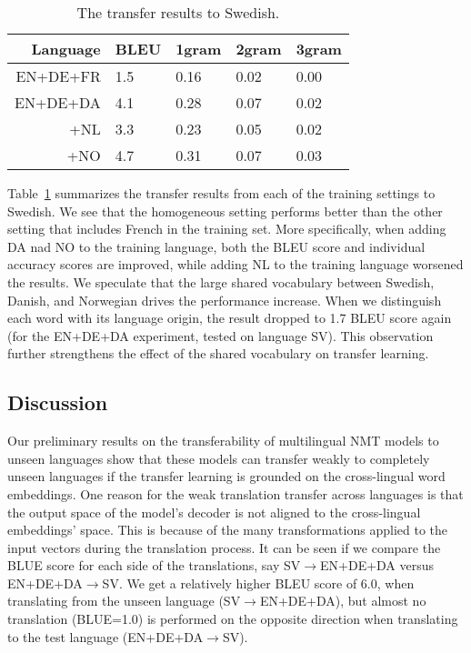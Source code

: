 \documentclass[11pt,a4paper]{article}
\begin{document}
\begin{table}
 \centering
 \begin{tabular}{|r|l|l|l|l|}
 \hline
 Language & BLEU & 1gram & 2gram & 3gram \\ [0.25ex]
 \hline\hline
 EN+DE+FR & 1.5 & 0.16 & 0.02 & 0.00 \\
 \hline
 EN+DE+DA & 4.1 & 0.28 & 0.07 & 0.02 \\
 \hline
 +NL & 3.3 & 0.23 & 0.05 & 0.02 \\ 
 \hline
 +NO & 4.7 & 0.31 & 0.07 & 0.03 \\
 \hline
 \end{tabular}
 \caption{The transfer results to Swedish.} %
 \label{table:language_similarity}
\end{table}

Table~\ref{table:language_similarity} summarizes the transfer results from each of the training settings to Swedish. 
We see that the homogeneous setting performs better than the other setting that includes French in the training set. 
More specifically, when adding DA nad NO to the training language, both the BLEU score and individual accuracy scores are improved, while adding NL to the training language worsened the results. We speculate that the large shared vocabulary between Swedish, Danish, and Norwegian drives the performance increase. 
When we distinguish each word with its language origin, the result dropped to 1.7 BLEU score again (for the EN+DE+DA experiment, tested on language SV).
This observation further strengthens the effect of the shared vocabulary on transfer learning. 

\subsection{Discussion}
Our preliminary results on the transferability of multilingual NMT models to unseen languages show that these models can transfer weakly to completely unseen languages if the transfer learning is grounded on the cross-lingual word embeddings. 
One reason for the weak translation transfer across languages is that the output space of the model's decoder is not aligned to the cross-lingual embeddings' space. This is because of the many transformations applied to the input vectors during the translation process. It can be seen if we compare the BLUE score for each side of the translations, say SV$\to$EN+DE+DA versus EN+DE+DA$\to$SV. We get a relatively higher BLEU score of 6.0, when translating from the unseen language (SV$\to$EN+DE+DA), but almost no translation (BLUE=1.0) is performed on the opposite direction when translating to the test language (EN+DE+DA$\to$SV). 
\end{document}
